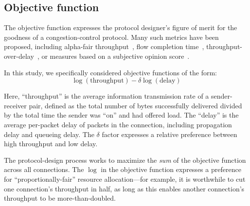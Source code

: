 \subsection{Objective function}
\label{ss:objective}
The objective function expresses the protocol designer's figure of
merit for the goodness of a congestion-control protocol. Many such
metrics have been proposed, including alpha-fair
throughput~\cite{Srikant}, flow completion time~\cite{dctcp},
throughput-over-delay~\cite{codelID}, or measures based on a
subjective opinion score~\cite{MOSCC}.

In this study, we specifically considered objective functions of the
form:
\begin{equation*}
\log\left( \textrm{throughput} \right)  - \delta \log\left( \textrm{delay} \right)
\end{equation*}

Here, ``throughput'' is the average information transmission rate of a
sender-receiver pair, defined as the total number of bytes
successfully delivered divided by the total time the sender was ``on''
and had offered load. The ``delay'' is the average per-packet delay of
packets in the connection, including propagation delay and queueing
delay. The $\delta$ factor expresses a relative preference between high throughput and low delay.

The protocol-design process works to maximize the \emph{sum} of the
objective function across all connections. The $\log$ in the objective
function expresses a preference for ``proportionally-fair'' resource
allocation---for example, it is worthwhile to cut one connection's
throughput in half, as long as this enables another connection's
throughput to be more-than-doubled.

